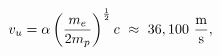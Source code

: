 \begin{equation}
v_u=\alpha\left(\frac{m_e}{2m_p}\right)^{\frac{1}{2}}c~\approx~36,100~\frac{\rm m}{\rm s},
\label{v3}
\end{equation}

